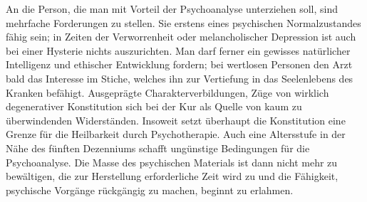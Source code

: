 \documentclass[twoside=true,titlepage=false,open=any, parskip=never, fontsize=10pt, headings=small, chapterprefix=false, appendixprefix=false]{scrbook}
\begin{document}
            
        \pstart
        An die Person, die man mit Vorteil der Psychoanalyse unterziehen
               soll, sind mehrfache Forderungen zu stellen. Sie  erstens eines psychischen Normalzustandes fähig sein; in Zeiten der Verworrenheit oder
               melancholischer Depression ist auch bei einer Hysterie nichts auszurichten. Man
               darf ferner ein gewisses
                natürlicher Intelligenz und ethischer Entwicklung fordern; bei wertlosen
               Personen  den Arzt bald das Interesse im Stiche, welches ihn zur Vertiefung in das
               Seelenlebens des Kranken befähigt. Ausgeprägte Charakterverbildungen, Züge
               von wirklich degenerativer Konstitution  sich bei der Kur als Quelle von kaum zu überwindenden Widerständen.
               Insoweit setzt überhaupt die Konstitution eine Grenze für die Heilbarkeit
               durch Psychotherapie. Auch eine Altersstufe in der Nähe des fünften
               Dezenniums schafft ungünstige Bedingungen für die Psychoanalyse. Die
               Masse des psychischen Materials ist dann nicht mehr zu bewältigen, die zur
               Herstellung erforderliche Zeit wird zu  und die Fähigkeit, psychische Vorgänge rückgängig zu machen, beginnt zu
                  erlahmen.
        \pend
    

            
            
\end{document}
